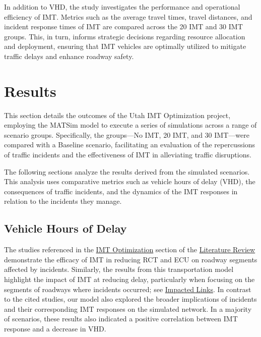 \documentclass[fancy, oneside, mastersfancy, ms]{byuthesis}
\begin{document}
In addition to VHD, the study investigates the performance and
operational efficiency of IMT. Metrics such as the average travel times,
travel distances, and incident response times of IMT are compared across
the 20 IMT and 30 IMT groups. This, in turn, informs strategic decisions
regarding resource allocation and deployment, ensuring that IMT vehicles
are optimally utilized to mitigate traffic delays and enhance roadway
safety.


\hypertarget{sec-results}{%
\chapter{Results}\label{sec-results}}

This section details the outcomes of the Utah IMT Optimization project,
employing the MATSim model to execute a series of simulations across a
range of scenario groups. Specifically, the groups---No IMT, 20 IMT, and
30 IMT---were compared with a Baseline scenario, facilitating an
evaluation of the repercussions of traffic incidents and the
effectiveness of IMT in alleviating traffic disruptions.

The following sections analyze the results derived from the simulated
scenarios. This analysis uses comparative metrics such as vehicle hours
of delay (VHD), the consequences of traffic incidents, and the dynamics
of the IMT responses in relation to the incidents they manage.

\hypertarget{vehicle-hours-of-delay}{%
\section{Vehicle Hours of Delay}\label{vehicle-hours-of-delay}}

The studies referenced in the \protect\hyperlink{sec-lit_imt_opt}{IMT
Optimization} section of the
\protect\hyperlink{sec-literature}{Literature Review} demonstrate the
efficacy of IMT in reducing RCT and ECU on roadway segments affected by
incidents. Similarly, the results from this transportation model
highlight the impact of IMT at reducing delay, particularly when
focusing on the segments of roadways where incidents occurred; see
\protect\hyperlink{sec-impacted}{Impacted Links}. In contrast to the
cited studies, our model also explored the broader implications of
incidents and their corresponding IMT responses on the simulated
network. In a majority of scenarios, these results also indicated a
positive correlation between IMT response and a decrease in VHD.
\end{document}
